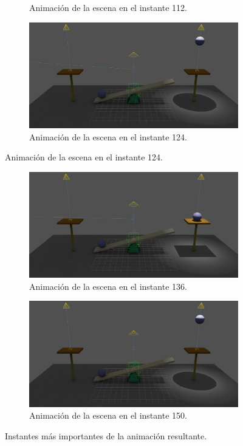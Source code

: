 \documentclass{article}
\begin{document}
\begin{figure}[H]
\begin{subfigure}[t]{0.48\textwidth}
    \caption{Animación de la escena en el instante 112.}
 \end{subfigure}
\hfill
 \begin{subfigure}[t]{0.48\textwidth}
    \centering
    \includegraphics[width=\textwidth]{imagenes/animaciones/general/124.jpg}
    \caption{Animación de la escena en el instante 124.}
 \end{subfigure}
\end{figure}

\begin{figure}[H]\ContinuedFloat
 \begin{subfigure}[t]{0.48\textwidth}
    \centering
    \includegraphics[width=\textwidth]{imagenes/animaciones/general/136.jpg}
    \caption{Animación de la escena en el instante 136.}
 \end{subfigure}
\hfill
 \begin{subfigure}[t]{0.48\textwidth}
    \centering
    \includegraphics[width=\textwidth]{imagenes/animaciones/general/150.jpg}
    \caption{Animación de la escena en el instante 150.}
 \end{subfigure}
 \caption{Instantes más importantes de la animación resultante.}
\end{figure}
\end{document}
